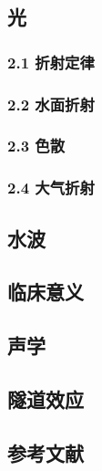 \subsection{光}

\subsubsection{2.1 折射定律}

\subsubsection{2.2 水面折射}

\subsubsection{2.3 色散}

\subsubsection{2.4 大气折射}

\subsection{水波}

\subsection{临床意义}

\subsection{声学}

\subsection{隧道效应}

\subsection{参考文献}